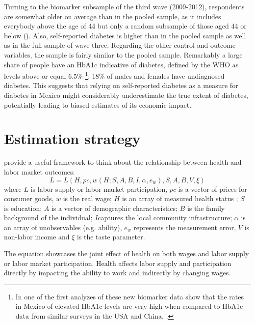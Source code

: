 \documentclass[12pt,english]{article}
\begin{document}
Turning to the biomarker subsample of the third wave (2009-2012), respondents are somewhat older on average than in the pooled sample, as it includes everybody above the age of 44 but only a random subsample of those aged 44 or below (\cite{Crimmins2015}). Also, self-reported diabetes is higher than in the pooled sample as well as in the full sample of wave three. Regarding the other control and outcome variables, the sample is fairly similar to the pooled sample. Remarkably a large share of people have an \ac{HbA1c} indicative of diabetes, defined by the \ac{WHO} as levels above or equal 6.5\% \parencite{WorldHealthOrganization2011}\footnote{In one of the first analyzes of these new biomarker data \textcite{Frankenberg2015} show that the rates in Mexico of elevated \ac{HbA1c} levels are very high when compared to \ac{HbA1c} data from similar surveys in the \ac{USA} and China. \parencite{Frankenberg2015}.}: 18\% of males and females have undiagnosed diabetes. This suggests that relying on self-reported diabetes as a measure for diabetes in Mexico might considerably underestimate the true extent of diabetes, potentially leading to biased estimates of its economic impact.

\section{\label{sec:Estimation Strategy}Estimation strategy}
 
\textcite{Strauss1998} provide a useful framework to think about the relationship between health and labor market outcomes:
\begin{equation}
L=L(H, pc, w(H;S,A,B,I,\alpha,e_{w}), S, A, B, V, \xi) \label{eq:wage}
\end{equation}
where $L$ is labor supply or labor market participation, $pc $ is a vector of prices for consumer goods, $w$ is the real wage; $H$ is an array of measured health status ; $S$ is education; $A$ is a vector of demographic characteristics; $B$ is the family background of the individual; $I$captures the local community infrastructure; $\alpha$ is an array of unobservables (e.g. ability), $e_w$ represents the measurement error, $V$ is non-labor income and $\xi$ is the taste parameter. 

The equation showcases the joint effect of health on both wages and labor supply or labor market participation. Health affects labor supply and participation directly by impacting the ability to work and indirectly by changing wages.
\end{document}
